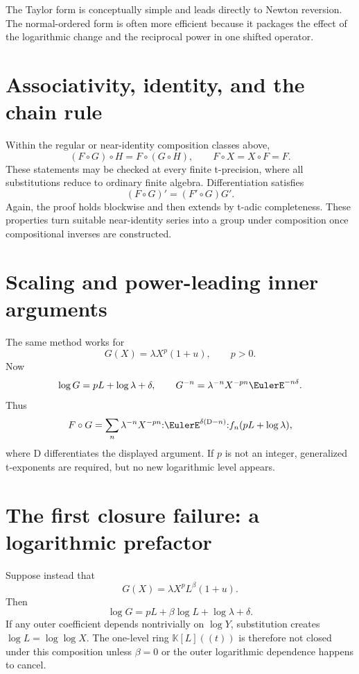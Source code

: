 \documentclass[11pt,openany]{book}
\theoremstyle{definition}
\theoremstyle{plain}
\theoremstyle{remark}
\newcommand{\K}{\mathbb{K}}
\newcommand{\Dop}{\mathrm{D}}
\newcommand{\compose}{\mathbin{\circ}}
\begin{document}
The Taylor form is conceptually simple and leads directly to Newton reversion.
The normal-ordered form is often more efficient because it packages the effect
of the logarithmic change and the reciprocal power in one shifted operator.

\section{Associativity, identity, and the chain rule}
Within the regular or near-identity composition classes above,
\[
 (F\compose G)\compose H=F\compose(G\compose H),
 \qquad
 F\compose X=X\compose F=F.
\]
These statements may be checked at every finite t-precision, where all
substitutions reduce to ordinary finite algebra.  Differentiation satisfies
\begin{equation}\label{eq:formal-chain-rule}
 (F\compose G)'=(F'\compose G)G'.
\end{equation}
Again, the proof holds blockwise and then extends by t-adic completeness.
These properties turn suitable near-identity series into a group under
composition once compositional inverses are constructed.

\section{Scaling and power-leading inner arguments}
The same method works for
\begin{equation}\label{eq:power-leading-inner}
 G(X)=\lambda X^p(1+u),
 \qquad p>0.
\end{equation}
Now
\[
 \log G=pL+\log\lambda+\delta,
 \qquad
 G^{-n}=\lambda^{-n}X^{-pn}\EulerE^{-n\delta}.
\]
Thus
\begin{equation}\label{eq:power-leading-composition}
 F\compose G
 =\sum_n\lambda^{-n}X^{-pn}
 \mathopen{:}\EulerE^{\delta(\Dop-n)}\mathclose{:}
 f_n(pL+\log\lambda),
\end{equation}
where \(\Dop\) differentiates the displayed argument.  If \(p\) is not an
integer, generalized t-exponents are required, but no new logarithmic level
appears.

\section{The first closure failure: a logarithmic prefactor}
Suppose instead that
\begin{equation}\label{eq:log-prefactor-inner}
 G(X)=\lambda X^pL^\beta(1+u).
\end{equation}
Then
\begin{equation}\label{eq:nested-log-created}
 \log G=pL+\beta\log L+\log\lambda+\delta.
\end{equation}
If any outer coefficient depends nontrivially on \(\log Y\), substitution
creates \(\log L=\log\log X\).  The one-level ring \(\K[L]((t))\) is therefore
not closed under this composition unless \(\beta=0\) or the outer logarithmic
dependence happens to cancel.
\end{document}
